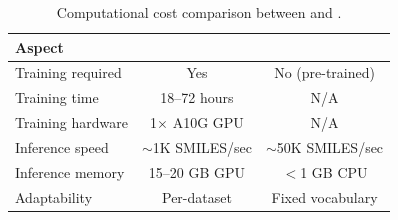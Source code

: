 
\begin{table}[t]
\caption{Computational cost comparison between \hnet{} and \smilespe{}.}
\label{tab:compute_cost}
\vskip 0.1in
\begin{center}
\begin{small}
\begin{tabular}{lcc}
\toprule
Aspect & \hnet{} & \smilespe{} \\
\midrule
Training required & Yes & No (pre-trained) \\
Training time & 18--72 hours & N/A \\
Training hardware & 1$\times$ A10G GPU & N/A \\
Inference speed & $\sim$1K SMILES/sec & $\sim$50K SMILES/sec \\
Inference memory & 15--20 GB GPU & $<$1 GB CPU \\
Adaptability & Per-dataset & Fixed vocabulary \\
\bottomrule
\end{tabular}
\end{small}
\end{center}
\vskip -0.1in
\end{table}
